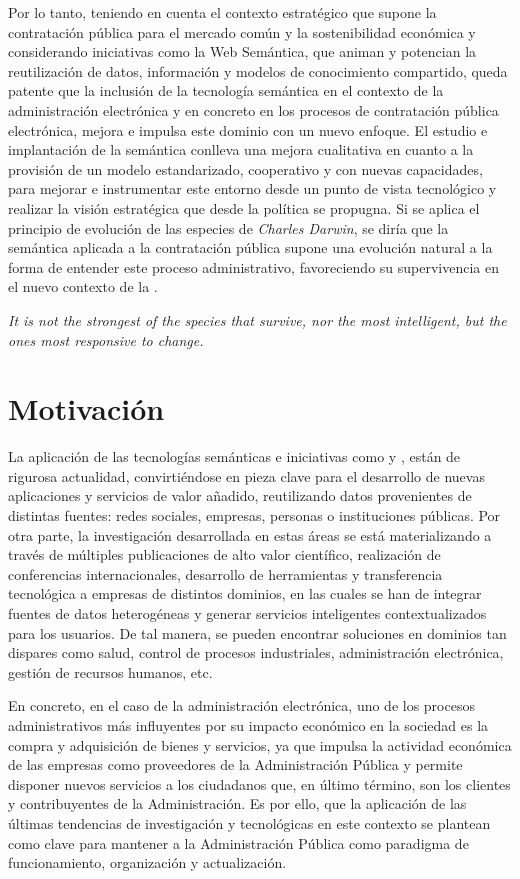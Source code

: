 Por lo tanto, teniendo en cuenta el contexto estratégico que supone la contratación pública
para el mercado común y la sostenibilidad económica y considerando iniciativas
como la Web Semántica, que animan y potencian la reutilización de datos, información
y modelos de conocimiento compartido, queda patente que la inclusión de la tecnología
semántica en el contexto de la administración electrónica y en concreto en los
procesos de contratación pública electrónica, mejora e impulsa este dominio con un 
nuevo enfoque. El estudio e implantación de la semántica conlleva una mejora
cualitativa en cuanto a la provisión de un modelo estandarizado, cooperativo y con
nuevas capacidades, para mejorar e instrumentar este entorno desde un punto
de vista tecnológico y realizar la visión estratégica que desde la política
se propugna. Si se aplica el principio de evolución de las especies
de \textit{Charles Darwin}, se diría que la semántica aplicada a la contratación pública
supone una evolución natural a la forma de entender este proceso administrativo, favoreciendo
su supervivencia en el nuevo contexto de la \wode.

\textit{It is not the strongest of the species that survive, nor the most
intelligent, but the ones most responsive to change.}

\section{Motivación}
La aplicación de las tecnologías semánticas e iniciativas como \opendata y
\linkeddata, están de rigurosa actualidad, convirtiéndose en pieza clave
para el desarrollo de nuevas aplicaciones y servicios de valor añadido,
reutilizando datos provenientes de distintas fuentes: redes sociales, empresas,
personas o instituciones públicas. Por otra parte, la investigación desarrollada
en estas áreas se está materializando a través de múltiples publicaciones de
alto valor científico, realización de conferencias internacionales, desarrollo
de herramientas y transferencia tecnológica a empresas de distintos
dominios, en las cuales se han de integrar fuentes de datos heterogéneas y generar
servicios inteligentes contextualizados para los usuarios. De tal manera, se pueden 
encontrar soluciones en dominios tan dispares como salud, control de procesos
industriales, administración electrónica, gestión de recursos humanos, etc.

En concreto, en el caso de la administración electrónica, uno de los procesos
administrativos más influyentes por su impacto económico en la sociedad es la compra y adquisición
de bienes y servicios, ya que impulsa la actividad económica de las empresas como proveedores
de la Administración Pública y permite disponer nuevos servicios a los ciudadanos que, en último término, son los clientes
y contribuyentes de la Administración. Es por ello, que la aplicación de
las últimas tendencias de investigación y tecnológicas en este contexto se plantean
como clave para mantener a la Administración Pública como paradigma de funcionamiento,
organización y actualización.

